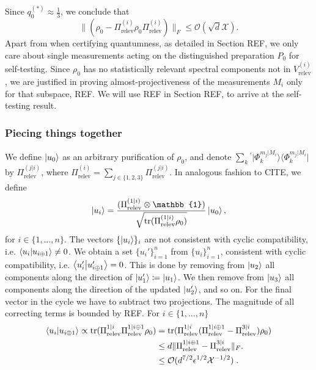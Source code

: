 Since $q_0^{(*)}\approx\frac{1}{3}$, we conclude that
\begin{equation}
\|(\rho_{0}-\Pi_{\text{relev}}^{(i)}\rho_{0}\Pi_{\text{relev}}^{(i)})\|_F \leq \mathcal{O}(\sqrt{d}\mathcal{X}).
\end{equation}
Apart from when certifying quantumness, as detailed in Section REF, we only care about single measurements acting on the distinguished preparation $P_0$ for self-testing. Since $\rho_0$ has no statistically relevant spectral components not in $V_{\text{relev}}^{(i)}$, we are justified in proving almost-projectiveness of the measurements $M_i$ only for that subspace, REF. We will use REF in Section REF, to arrive at the self-testing result.
\subsubsection{Piecing things together}
We define $\ket{u_0}$ as an arbitrary purification of $\rho_0$, and denote $\sum_{k}{}^{'}\vert \Phi_k^{m_j\vert M_i}\rangle \langle \Phi_k^{m_j\vert M_i}\vert$ by $\Pi_{\text{relev}}^{(j\vert i)}$, where $\Pi_{\text{relev}}^{(i)}=\sum_{j\in\{1,2,3\}}\Pi_{\text{relev}}^{(j\vert i)}$. In analogous fashion to CITE, we define
\begin{equation}
\ket{u_i} = \frac{(\Pi_{\text{relev}}^{(1\vert i)}\otimes\mathbb{1})}{\sqrt{\operatorname{tr}(\Pi_{\text{relev}}^{(1\vert i)}\rho_0)}}\ket{u_0},
\end{equation}
for $i\in\{1,\dots,n\}$. The vectors $\{\ket{u_i}\}_i$ are not consistent with cyclic compatibility, i.e. $\bra{u_i}\ket{u_{i\oplus 1}}\neq 0$.
We obtain a set $\{u_i'\}_{i=1}^n$ from $\{u_i\}_{i=1}^n$, consistent with cyclic compatibility, i.e. $\bra{u_i'}\ket{u_{i\oplus 1}'}=0$. This is done by removing from $\ket{u_2}$ all components along the direction of $\ket{u_1'}\coloneqq\ket{u_1}$. We then remove from $\ket{u_3}$ all components along the direction of the updated $\ket{u_2'}$, and so on. For the final vector in the cycle we have to subtract two projections. The magnitude of all correcting terms is bounded by REF.
For $i\in\{1,\dots,n\}$
\begin{equation}
\begin{split}
\bra{u_i}\ket{u_{i\oplus 1}}\propto\operatorname{tr}(\Pi_{\text{relev}}^{1\vert i}\Pi_{\text{relev}}^{1\vert i\oplus 1}\rho_0) & =\operatorname{tr}(\Pi_{\text{relev}}^{1\vert i}(\Pi_{\text{relev}}^{1\vert i\oplus 1}-\Pi_{\text{relev}}^{3\vert i})\rho_0)\\ & \leq d \|\Pi_{\text{relev}}^{1\vert i\oplus 1}-\Pi_{\text{relev}}^{3\vert i}\|_F.\\ & \leq \mathcal{O}(d^{7/2}\epsilon^{1/2}\mathcal{X}^{-1/2})\; .
\end{split}
\end{equation}


